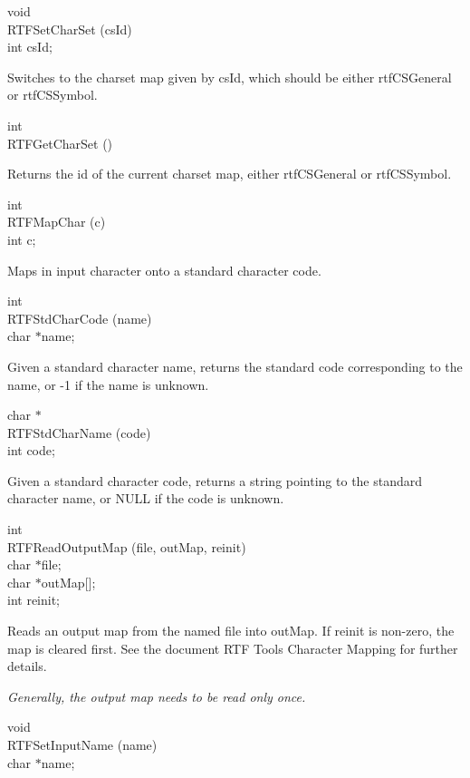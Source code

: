 \documentclass{article}
\begin{document}
\noindent
void\\
RTFSetCharSet (csId)\\
int	csId;




\noindent
Switches to the charset map given by csId, which should be either rtfCSGeneral 
or rtfCSSymbol.




\noindent
int\\
RTFGetCharSet ()




\noindent
Returns the id of the current charset map, either rtfCSGeneral or rtfCSSymbol.




\noindent
int\\
RTFMapChar (c)\\
int	c;




\noindent
Maps in input character onto a standard character code.




\noindent
int\\
RTFStdCharCode (name)\\
char	$\ast $name;




\noindent
Given a standard character name, returns the standard code corresponding 
to the name, or -1 if the name is unknown.




\noindent
char $\ast $\\
RTFStdCharName (code)\\
int	code;




\noindent
Given a standard character code, returns a string pointing to the standard 
character name, or NULL if the code is unknown.




\noindent
int\\
RTFReadOutputMap (file, outMap, reinit)\\
char	$\ast $file;\\
char	$\ast $outMap[];\\
int	reinit;




\noindent
Reads an output map from the named file into outMap. If reinit is non-zero, 
the map is cleared first. See the document RTF Tools Character Mapping for 
further details.



\noindent
{\em Generally, the output map needs to be read only once.



}
\noindent
void\\
RTFSetInputName (name)\\
char	$\ast $name;
\end{document}
